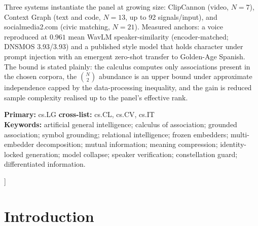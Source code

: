 \documentclass[10pt,twocolumn]{article}
\begin{document}
\begin{@twocolumnfalse}
\begin{center}
\begin{minipage}{0.93\textwidth}
Three systems instantiate the panel at growing size: ClipCannon (video, $N=7$),
Context Graph (text and code, $N=13$, up to 92 signals/input), and socialmedia2.com
(civic matching, $N=21$). Measured anchors: a voice reproduced at $0.961$ mean
WavLM speaker-similarity (encoder-matched; DNSMOS 3.93/3.93) and a published style
model that holds character under prompt injection with an emergent zero-shot
transfer to Golden-Age Spanish. The bound is stated plainly: the calculus computes
only associations present in the chosen corpora, the $\binom{N}{2}$ abundance is an
upper bound under approximate independence capped by the data-processing
inequality, and the gain is reduced sample complexity realised up to the panel's
effective rank.

\medskip
\noindent\textbf{Primary:} cs.LG \;\textperiodcentered\; \textbf{cross-list:}
cs.CL, cs.CV, cs.IT\\
\noindent\textbf{Keywords:} artificial general intelligence; calculus of
association; grounded association; symbol grounding; relational intelligence;
frozen embedders; multi-embedder
decomposition; mutual information; meaning compression; identity-locked
generation; model collapse; speaker verification; constellation guard;
differentiated information.

\end{minipage}
\end{center}
\vspace{1.4em}
\end{@twocolumnfalse}
]

\clearpage   %

\section{Introduction}
\end{document}
